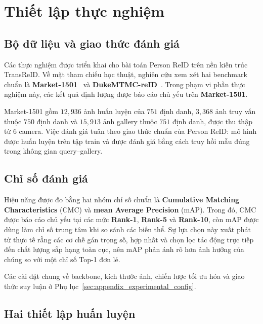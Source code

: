 \section{Thiết lập thực nghiệm}
\label{sec:experimental_setup}

\subsection{Bộ dữ liệu và giao thức đánh giá}

Các thực nghiệm được triển khai cho bài toán Person ReID trên nền kiến trúc TransReID. Về mặt tham chiếu học thuật, nghiên cứu xem xét hai benchmark chuẩn là \textbf{Market-1501}~\cite{zheng2015market1501} và \textbf{DukeMTMC-reID}~\cite{gou2017dukemtmc4reid}. Trong phạm vi phần thực nghiệm này, các kết quả định lượng được báo cáo chủ yếu trên \textbf{Market-1501}.

Market-1501 gồm $12{,}936$ ảnh huấn luyện của $751$ định danh, $3{,}368$ ảnh truy vấn thuộc $750$ định danh và $15{,}913$ ảnh gallery thuộc $751$ định danh, được thu thập từ $6$ camera. Việc đánh giá tuân theo giao thức chuẩn của Person ReID: mô hình được huấn luyện trên tập train và được đánh giá bằng cách truy hồi mẫu đúng trong không gian query--gallery.

\subsection{Chỉ số đánh giá}

Hiệu năng được đo bằng hai nhóm chỉ số chuẩn là \textbf{Cumulative Matching Characteristics} (CMC) và \textbf{mean Average Precision} (mAP). Trong đó, CMC được báo cáo chủ yếu tại các mức \textbf{Rank-1}, \textbf{Rank-5} và \textbf{Rank-10}, còn mAP được dùng làm chỉ số trung tâm khi so sánh các biến thể. Sự lựa chọn này xuất phát từ thực tế rằng các cơ chế gán trọng số, hợp nhất và chọn lọc tác động trực tiếp đến chất lượng sắp hạng toàn cục, nên mAP phản ánh rõ hơn ảnh hưởng của chúng so với một chỉ số Top-1 đơn lẻ.

Các cài đặt chung về backbone, kích thước ảnh, chiến lược tối ưu hóa và giao
thức suy luận ở Phụ lục~\ref{sec:appendix_experimental_config}.

\subsection{Hai thiết lập huấn luyện}

